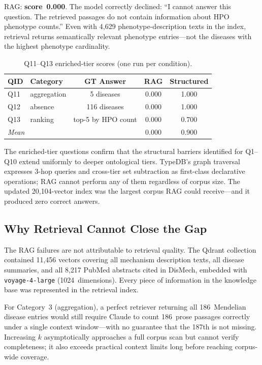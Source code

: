 RAG: \textbf{score~0.000}. The model correctly declined: ``I cannot answer
this question. The retrieved passages do not contain information about HPO
phenotype counts.'' Even with 4{,}629 phenotype-description texts in the index,
retrieval returns semantically relevant phenotype entries---not the diseases
with the highest phenotype cardinality.

\begin{table}[h]
\caption{Q11--Q13 enriched-tier scores (one run per condition).}
\label{tab:enriched}
\small
\centering
\begin{tabular}{llccc}
\toprule
QID & Category & GT Answer & RAG & Structured \\
\midrule
Q11 & aggregation & 5 diseases   & 0.000 & 1.000 \\
Q12 & absence     & 116 diseases & 0.000 & 1.000 \\
Q13 & ranking     & top-5 by HPO count & 0.000 & 0.700 \\
\midrule
\multicolumn{3}{l}{\textit{Mean}} & 0.000 & 0.900 \\
\bottomrule
\end{tabular}
\end{table}

The enriched-tier questions confirm that the structural barriers identified for
Q1--Q10 extend uniformly to deeper ontological tiers. TypeDB's graph traversal
expresses 3-hop queries and cross-tier set subtraction as first-class
declarative operations; RAG cannot perform any of them regardless of corpus
size. The updated 20{,}104-vector index was the largest corpus RAG could
receive---and it produced zero correct answers.

\subsection{Why Retrieval Cannot Close the Gap}
\label{sec:results-analysis}

The RAG failures are not attributable to retrieval quality. The Qdrant
collection contained 11{,}456 vectors covering all mechanism description texts,
all disease summaries, and all 8{,}217 PubMed abstracts cited in DisMech,
embedded with \texttt{voyage-4-large} (1024~dimensions). Every piece of
information in the knowledge base was represented in the retrieval index.

For Category~3 (aggregation), a perfect retriever returning all 186~Mendelian
disease entries would still require Claude to count 186~prose passages correctly
under a single context window---with no guarantee that the 187th is not missing.
Increasing $k$ asymptotically approaches a full corpus scan but cannot verify
completeness; it also exceeds practical context limits long before reaching
corpus-wide coverage.

